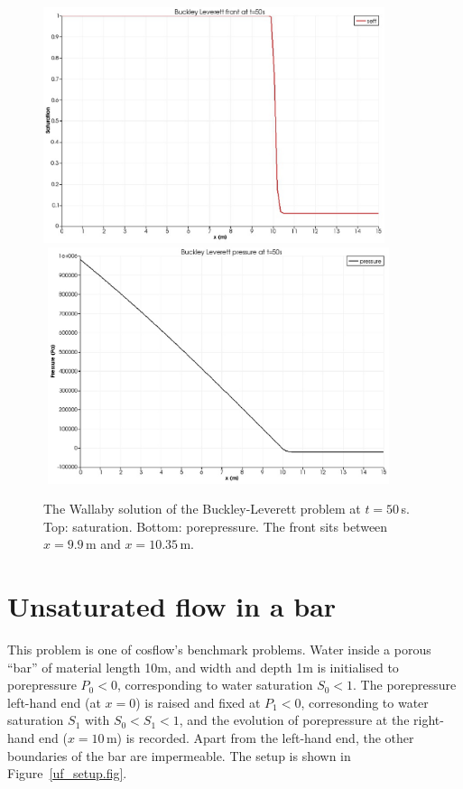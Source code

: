 \documentclass[]{scrreprt}
\begin{document}
\begin{figure}[htb]
\begin{center}
\includegraphics[width=10cm]{bl_seff.eps} \\
$\mbox{}$
\includegraphics[width=10cm]{bl_p.eps} \\
\caption{The Wallaby solution of the Buckley-Leverett problem at
  $t=50$\,s.  Top: saturation.  Bottom: porepressure.  The front sits
  between $x=9.9$\,m and $x=10.35$\,m.}
\label{satfront.figa}
\end{center}
\end{figure}


\chapter{Unsaturated flow in a bar}

This problem is one of cosflow's benchmark problems.  Water inside a
porous ``bar'' of material length 10m, and width and depth 1m is
initialised to porepressure $P_{0}<0$, corresponding to water
saturation $S_{0}<1$.  The porepressure left-hand end (at $x=0$) is
raised and fixed at $P_{1}<0$, corresonding to water saturation
$S_{1}$ with $S_{0}<S_{1}<1$, and the evolution of porepressure at the
right-hand end ($x=10$\,m) is recorded.  Apart from the left-hand end,
the other boundaries of the bar are impermeable.  The setup is shown in
Figure~\ref{uf_setup.fig}.
\end{document}
